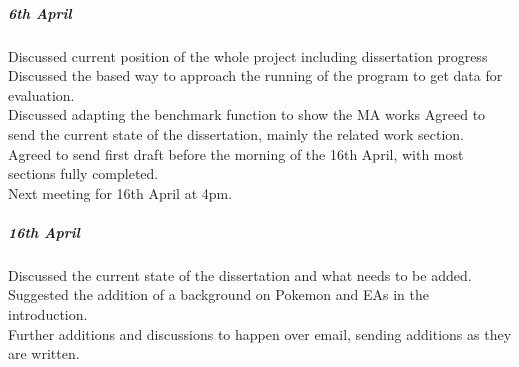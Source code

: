 \documentclass[a4paper]{article}
\begin{document}
\subparagraph{6th April}
Discussed current position of the whole project including dissertation progress
Discussed the based way to approach the running of the program to get data for evaluation.\\
Discussed adapting the benchmark function to show the MA works
Agreed to send the current state of the dissertation, mainly the related work section.\\
Agreed to send first draft before the morning of the 16th April, with most sections fully completed.\\
Next meeting for 16th April at 4pm.
\subparagraph{16th April}
Discussed the current state of the dissertation and what needs to be added. \\
Suggested the addition of a background on Pokemon and EAs in the introduction. \\
Further additions and discussions to happen over email, sending additions as they are written. \\

\pagebreak
\end{document}
